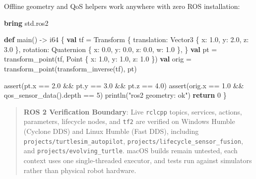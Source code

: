 \documentclass[
  english,
  oneside]{book}
\newenvironment{Shaded}{\begin{snugshade}}{\end{snugshade}}
\newcommand{\ControlFlowTok}[1]{\textcolor[rgb]{0.77,0.53,0.75}{\textbf{#1}}}
\newcommand{\DataTypeTok}[1]{\textcolor[rgb]{0.31,0.79,0.69}{#1}}
\newcommand{\DecValTok}[1]{\textcolor[rgb]{0.71,0.81,0.66}{#1}}
\newcommand{\FloatTok}[1]{\textcolor[rgb]{0.71,0.81,0.66}{#1}}
\newcommand{\FunctionTok}[1]{\textcolor[rgb]{0.86,0.86,0.67}{#1}}
\newcommand{\KeywordTok}[1]{\textcolor[rgb]{0.34,0.61,0.84}{\textbf{#1}}}
\newcommand{\NormalTok}[1]{\textcolor[rgb]{0.83,0.83,0.83}{#1}}
\newcommand{\OperatorTok}[1]{\textcolor[rgb]{0.83,0.83,0.83}{#1}}
\newcommand{\StringTok}[1]{\textcolor[rgb]{0.81,0.57,0.47}{#1}}
\begin{document}
Offline geometry and QoS helpers work anywhere with zero ROS
installation:

\begin{Shaded}
\begin{Highlighting}[]
\KeywordTok{bring}\NormalTok{ std}\OperatorTok{.}\NormalTok{ros2}

\KeywordTok{def}\NormalTok{ main() }\OperatorTok{{-}\textgreater{}} \DataTypeTok{i64}\NormalTok{ \{}
    \KeywordTok{val}\NormalTok{ tf }\OperatorTok{=}\NormalTok{ Transform \{}
\NormalTok{        translation: Vector3 \{ x: }\FloatTok{1.0}\NormalTok{, y: }\FloatTok{2.0}\NormalTok{, z: }\FloatTok{3.0}\NormalTok{ \},}
\NormalTok{        rotation: Quaternion \{ x: }\FloatTok{0.0}\NormalTok{, y: }\FloatTok{0.0}\NormalTok{, z: }\FloatTok{0.0}\NormalTok{, w: }\FloatTok{1.0}\NormalTok{ \},}
\NormalTok{    \}}
    \KeywordTok{val}\NormalTok{ pt }\OperatorTok{=}\NormalTok{ transform\_point(tf, Point \{ x: }\FloatTok{1.0}\NormalTok{, y: }\FloatTok{1.0}\NormalTok{, z: }\FloatTok{1.0}\NormalTok{ \})}
    \KeywordTok{val}\NormalTok{ orig }\OperatorTok{=}\NormalTok{ transform\_point(transform\_inverse(tf), pt)}

    \FunctionTok{assert}\NormalTok{(pt}\OperatorTok{.}\NormalTok{x }\OperatorTok{==} \FloatTok{2.0} \OperatorTok{\&\&}\NormalTok{ pt}\OperatorTok{.}\NormalTok{y }\OperatorTok{==} \FloatTok{3.0} \OperatorTok{\&\&}\NormalTok{ pt}\OperatorTok{.}\NormalTok{z }\OperatorTok{==} \FloatTok{4.0}\NormalTok{)}
    \FunctionTok{assert}\NormalTok{(orig}\OperatorTok{.}\NormalTok{x }\OperatorTok{==} \FloatTok{1.0} \OperatorTok{\&\&}\NormalTok{ qos\_sensor\_data()}\OperatorTok{.}\NormalTok{depth }\OperatorTok{==} \DecValTok{5}\NormalTok{)}
\NormalTok{    println(}\StringTok{"ros2 geometry: ok"}\NormalTok{)}
    \ControlFlowTok{return} \DecValTok{0}
\NormalTok{\}}
\end{Highlighting}
\end{Shaded}

\begin{quote}
\textbf{ROS 2 Verification Boundary}: Live \texttt{rclcpp} topics,
services, actions, parameters, lifecycle nodes, and \texttt{tf2} are
verified on Windows Humble (Cyclone DDS) and Linux Humble (Fast DDS),
including \texttt{projects/turtlesim\_autopilot},
\texttt{projects/lifecycle\_sensor\_fusion}, and
\texttt{projects/evolving\_turtle}. macOS builds remain untested, each
context uses one single-threaded executor, and tests run against
simulators rather than physical robot hardware.
\end{quote}
\end{document}
